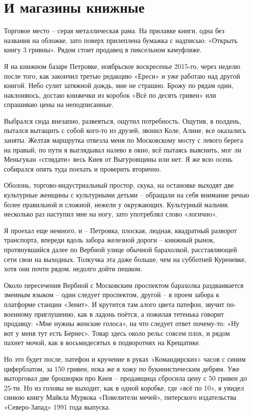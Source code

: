 \chapter{И магазины книжные}

Торговое место – серая металлическая рама. На прилавке книги, одна без названия на обложке, зато поверх прилеплена бумажка с надписью: «Открыть книгу 3 гривны». Рядом стоит продавец в пиксельном камуфляже.

Я на книжном базаре Петровке, ноябрьское воскресенье 2015-го, через неделю после того, как закончил третью редакцию «Ереси» и уже работаю над другой книгой. Небо сулит затяжной дождь, мне не страшно. Брожу по рядам один, наклоняюсь, достаю книжечки из коробок «Всё по десять гривен» или спрашиваю цены на неподписанные. 

Выбрался сюда внезапно, развеяться, ощутил потребность. Ощутив, в полдень, пытался вытащить с собой кого-то из друзей, звонил Коле, Алине, все оказались заняты. Желтая маршрутка отвезла меня по Московскому мосту с левого берега на правый, по пути я выглядывал налево в окно, всё пытаясь выяснить, мог ли Меньгукан «сглядати» весь Киев от Выгуровщины или нет. Я же всю осень собирался опять туда поехать и проверить вторично.

Оболонь, торгово-индустриальный простор, скука, на остановке выходят две культурные женщины с культурными детьми – обращали на себя внимание речью более правильной и сложной, нежели у окружающих. Культурный мальчик несколько раз наступил мне на ногу, зато употреблял слово «логично».

Я проехал еще немного, и – Петровка, плоская, людная, квадратный разворот транспорта, впереди вдоль забора железной дороги – книжный рынок, протянувшийся далее по Вербной улице обычной барахолкой, расставляющей сети свои на выходных. Толкучка эта даже больше, чем на субботней Куреневке, хотя они почти рядом, недолго дойти пешком.

Около пересечения Вербной с Московским проспектом барахолка раздваивается змеиным языком – один следует проспектом, другой – в проем забора к платформе станции «Зенит». И крутится там алого цвета патефон, звучит по-военному приглушенно, как в ладонь поётся, а пожилая тетенька говорит продавцу: «Мне нужны женские голоса», на что следует ответ почему-то: «Ну вот у меня тут есть Бернес». Товар здесь около рельс совсем плох, и рядом пахнет мочой, как в восьмидесятых в подворотнях на Крещатике.

Но это будет после, патефон и кручение в руках «Командирских» часов с синим циферблатом, за 150 гривен, пока же я хожу по букинистическим дебрям. Уже выторговал две брошюрки про Киев – продавщица сбросила цену с 50 гривен до 25-ти. Но из головы не выходит, как в одной коробке, где «всё по 10», я увидел синюю книгу Майкла Муркока «Повелители мечей», питерского издательства «Северо-Запад» 1991 года выпуска.

